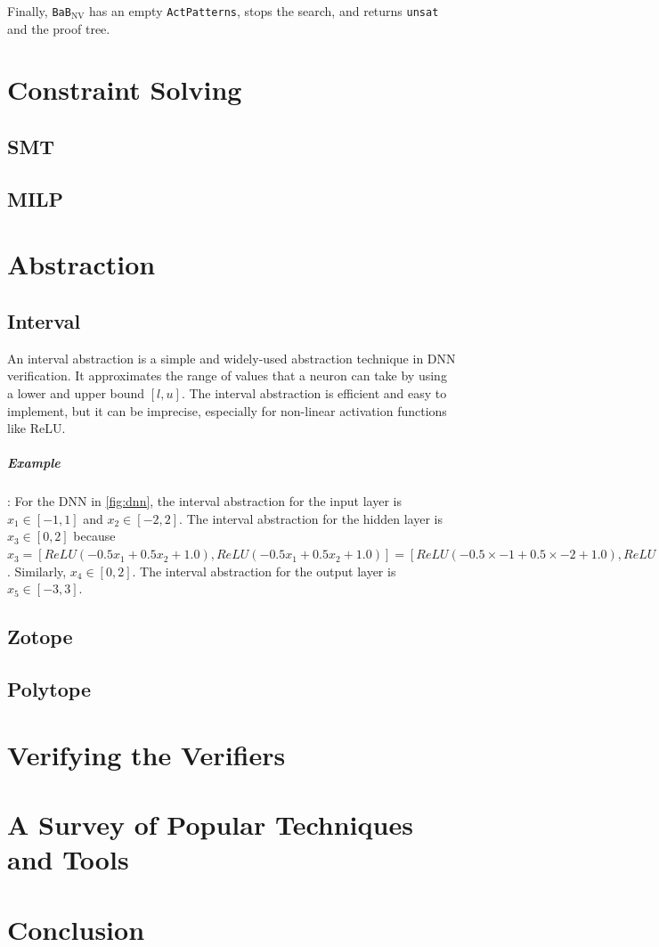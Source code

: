 \documentclass[oneside,11pt,dvipsnames]{book}
\newcommand{\dd}{\texttt{BaB$_{\text{NV}}$}}
\begin{document}
Finally, \dd{} has an empty \texttt{ActPatterns}, stops the search, and returns \texttt{unsat} and the proof tree. 



\chapter{Constraint Solving}
\section{SMT}
\section{MILP}
\chapter{Abstraction}

\section{Interval}

An interval abstraction is a simple and widely-used abstraction technique in DNN verification. It approximates the range of values that a neuron can take by using a lower and upper bound $[l, u]$. The interval abstraction is efficient and easy to implement, but it can be imprecise, especially for non-linear activation functions like ReLU. 

\paragraph{Example}: For the DNN in \autoref{fig:dnn}, the interval abstraction for the input layer is $x_1 \in [-1, 1]$ and $x_2 \in [-2, 2]$. The interval abstraction for the hidden layer is $x_3 \in [0, 2]$ because $x_3 = [ReLU(-0.5x_1 + 0.5x_2 + 1.0), ReLU(-0.5x_1 + 0.5x_2 + 1.0)] = [ReLU(-0.5 \times -1 + 0.5 \times -2 + 1.0), ReLU(-0.5 \times 1 + 0.5 \times 2 + 1.0)] = [0, 2]$. Similarly, $x_4 \in [0, 2]$. The interval abstraction for the output layer is $x_5 \in [-3, 3]$.




\section{Zotope}
\section{Polytope}

\chapter{Verifying the Verifiers}

\chapter{A Survey of Popular Techniques and Tools}


\chapter{Conclusion}





\appendix
\end{document}
